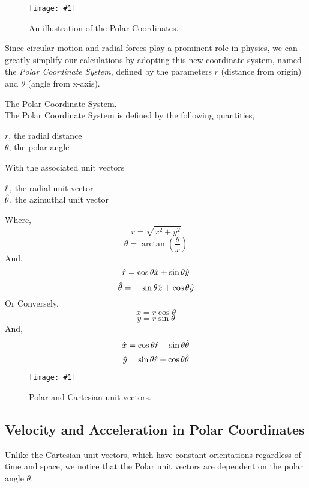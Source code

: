 \documentclass[11pt]{article}
\newcommand{\fig}[4]{
    \begin{figure}[H]
        \centering
        \texttt{[image: \#1]}
        \caption{#2}
        \label{exp4fit}
    \end{figure}
}
\theoremstyle{gangnamstyle}{\newtheorem{definition}{Definition}[]}
\theoremstyle{gangnamstyle}{\newtheorem{example}{Example}[]}
\theoremstyle{gangnamstyle}{\newtheorem{problem}{Problem}[]}
\begin{document}
\fig{figs/n0/polar.jpg}{An illustration of the Polar Coordinates.}{0.1}{0}

Since circular motion and radial forces play a prominent role in physics, we can greatly simplify our calculations by adopting this new coordinate system, named the \textit{Polar Coordinate System}, defined by the parameters $r$ (distance from origin) and $\theta$ (angle from x-axis). 

\begin{definition}
The Polar Coordinate System. \\
The Polar Coordinate System is defined by the following quantities, 
\begin{center}
    $r$, the radial distance \\
    $\theta$, the polar angle
\end{center}
With the associated unit vectors 
\begin{center}
    $\Hat{r}$, the radial unit vector \\
    $\Hat{\theta}$, the azimuthal unit vector
\end{center}
Where, 
\begin{equation}
    r = \sqrt{x^2 + y^2}
\end{equation}
\begin{equation}
    \theta = \arctan(\frac{y}{x})
\end{equation}
And, 
\begin{equation}
    \Hat{r} = \cos\theta\Hat{x} + \sin\theta\Hat{y}
\end{equation}
\begin{equation}
    \Hat{\theta} = -\sin\theta\Hat{x} + \cos\theta\Hat{y}
\end{equation}
Or Conversely, 
\begin{equation}
    x = r\cos\theta
\end{equation}
\begin{equation}
    y = r\sin\theta
\end{equation}
And, 
\begin{equation}
    \Hat{x} = \cos\theta\Hat{r} - \sin\theta\Hat{\theta}
\end{equation}
\begin{equation}
    \Hat{y} = \sin\theta\Hat{r} + \cos\theta\Hat{\theta}
\end{equation}
\end{definition}

\fig{figs/n0/unit-vectors.jpg}{Polar and Cartesian unit vectors.}{0.1}{0}

\subsection{Velocity and Acceleration in Polar Coordinates}
Unlike the Cartesian unit vectors, which have constant orientations regardless of time and space, we notice that the Polar unit vectors are dependent on the polar angle $\theta$. 
\end{document}
